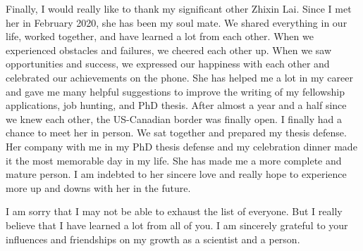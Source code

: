 Finally, I would really like to thank my significant other Zhixin Lai. Since I met her in February 2020, she has been my soul mate. We shared everything in our life, worked together, and have learned a lot from each other. When we experienced obstacles and failures, we cheered each other up. When we saw opportunities and success, we expressed our happiness with each other and celebrated our achievements on the phone. She has helped me a lot in my career and gave me many helpful suggestions to improve the writing of my fellowship applications, job hunting, and PhD thesis. After almost a year and a half since we knew each other, the US-Canadian border was finally open. I finally had a chance to meet her in person. We sat together and prepared my thesis defense. Her company with me in my PhD thesis defense and my celebration dinner made it the most memorable day in my life. She has made me a more complete and mature person. I am indebted to her sincere love and really hope to experience more up and downs with her in the future.



















I am sorry that I may not be able to exhaust the list of everyone. But I really believe that I have learned a lot from all of you. I am sincerely grateful to your influences and friendships on my growth as a scientist and a person. 

